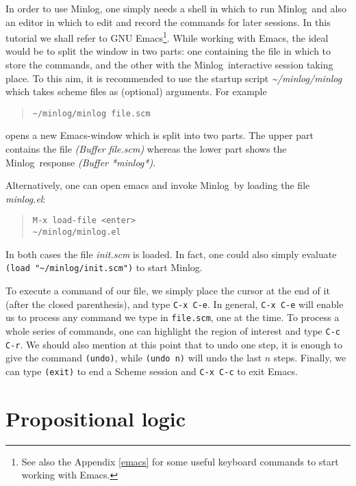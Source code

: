 \documentclass[12pt]{amsart}
\newcommand{\mi}{Minlog}
\newcommand{\mdir}{\~{}/minlog}
\begin{document}
In order to use \mi, one simply needs a shell in which to run \mi\ and
also an editor in which to edit and record the commands for later
sessions.  In this tutorial we shall refer to GNU Emacs\footnote{See
  also the Appendix \ref{emacs} for some useful keyboard commands to
  start working with Emacs.}.  While working with Emacs, the ideal
would be to split the window in two parts: one containing the file in
which to store the commands, and the other with the \mi\ interactive
session taking place.  To this aim, it is recommended to use the
startup script \emph{\mdir/minlog} which takes scheme files as
(optional) arguments. For example
\begin{quote}
  \texttt{\mdir/minlog file.scm}
\end{quote}
opens a new Emacs-window which is split into two parts.  The upper
part contains the file  \emph{(Buffer file.scm)} whereas the lower part
shows the \mi\ response \emph{(Buffer *minlog*)}.

Alternatively, one can open emacs and invoke \mi\ by loading the file
\emph{minlog.el}:
\begin{quote}
  \texttt{M-x load-file <enter>}\\
  \texttt{\mdir/minlog.el}
\end{quote}
In both cases the file \emph{init.scm} is loaded. In fact, one could
also simply evaluate \texttt{(load "\mdir/init.scm")} to start \mi.

To execute a command of our file, we simply place the cursor
at the end of it (after the closed parenthesis), and type
\texttt{C-x C-e}.  In general, \texttt{C-x C-e} will
enable us to process  any command we type in
\texttt{file.scm}, one at the time.  To process a whole
series of commands, one can  highlight the region of interest and
type \texttt{C-c C-r}.  We should also mention at this
point that to undo one step, it is enough  to give the command
\texttt{(undo)}, while \texttt{(undo n)} will undo  the last $n$
steps.  Finally, we can type  \texttt{(exit)} to end a Scheme
session and  \texttt{C-x C-c} to exit Emacs.


\section{Propositional logic}
\end{document}
